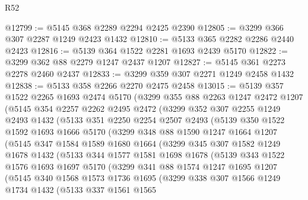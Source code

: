 \begin{lexlean}{R52}
\begin{coremodule}
@12799 := @5145 @368 @2289 @2294 @2425 @2390
@12805 := @3299 @366 @307 @2287 @1249 @2423 @1432
@12810 := @5133 @365 @2282 @2286 @2440 @2423
@12816 := @5139 @364 @1522 @2281 @1693 @2439 @5170
@12822 := @3299 @362 @88 @2279 @1247 @2437 @1207
@12827 := @5145 @361 @2273 @2278 @2460 @2437
@12833 := @3299 @359 @307 @2271 @1249 @2458 @1432
@12838 := @5133 @358 @2266 @2270 @2475 @2458
@13015 := @5139
    @357
    @1522
    @2265
    @1693
    @2474
    @5170
    (@3299
      @355
      @88
      @2263
      @1247
      @2472
      @1207
      (@5145
        @354
        @2257
        @2262
        @2495
        @2472
        (@3299
          @352
          @307
          @2255
          @1249
          @2493
          @1432
          (@5133
            @351
            @2250
            @2254
            @2507
            @2493
            (@5139
              @350
              @1522
              @1592
              @1693
              @1666
              @5170
              (@3299
                @348
                @88
                @1590
                @1247
                @1664
                @1207
                (@5145
                  @347
                  @1584
                  @1589
                  @1680
                  @1664
                  (@3299
                    @345
                    @307
                    @1582
                    @1249
                    @1678
                    @1432
                    (@5133
                      @344
                      @1577
                      @1581
                      @1698
                      @1678
                      (@5139
                        @343
                        @1522
                        @1576
                        @1693
                        @1697
                        @5170
                        (@3299
                          @341
                          @88
                          @1574
                          @1247
                          @1695
                          @1207
                          (@5145
                            @340
                            @1568
                            @1573
                            @1736
                            @1695
                            (@3299
                              @338
                              @307
                              @1566
                              @1249
                              @1734
                              @1432
                              (@5133
                                @337
                                @1561
                                @1565

\end{coremodule}
\end{lexlean}
